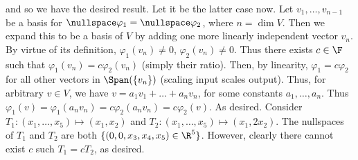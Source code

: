 \documentclass{book}
\begin{document}
\begin{enumerate}[label=\arabic*)]
      and so we have the desired result. Let it be the latter case now. Let $v_1, \dots, v_{n - 1}$ be a basis for $\nullspace\varphi_1 = \nullspace\varphi_2$, where $n = \dim V$. Then we expand
      this to be a basis of $V$ by adding one more linearly independent vector $v_n$. By virtue of its definition, $\varphi_1(v_n) \neq 0$, $\varphi_2(v_n) \neq 0$. Thus there exists $c \in
      \F$ such that $\varphi_1(v_n) = c\varphi_2(v_n)$ (simply their ratio). Then, by linearity, $\varphi_1 = c\varphi_2$ for all other vectors in $\Span(\{v_n\})$ (scaling input scales
      output). Thus, for arbitrary $v \in V$, we have $v = a_1v_1 + \dots + a_nv_n$, for some constants $a_1, \dots, a_n$. Thus $\varphi_1(v) = \varphi_1(a_nv_n) = c\varphi_2(a_nv_n) =
      c\varphi_2(v)$. As desired.
    \ii
      Consider $T_1: (x_1, \dots, x_5) \mapsto (x_1, x_2)$ and $T_2: (x_1, \dots, x_5) \mapsto (x_1, 2x_2)$. The nullspaces of $T_1$ and $T_2$ are both $\{(0, 0, x_3, x_4, x_5) \in \R^5\}$.
      However, clearly there cannot exist $c$ such $T_1 = cT_2$, as desired.
  \end{enumerate}
\end{document}
